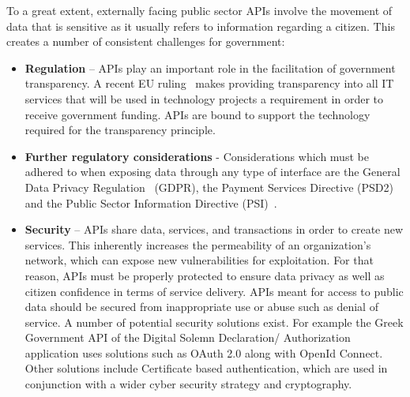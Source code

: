 To a great extent, externally facing public sector APIs involve the movement
of data that is sensitive as it usually refers to information regarding
a citizen. This creates a number of consistent challenges for government:
\begin{itemize}
	\item \textbf{Regulation} – APIs play an important role in the facilitation of
	government transparency. A recent EU ruling~\citep{eu_funding} makes providing
	transparency into all IT services that will be used in technology projects
	a requirement in order to receive government funding. APIs are bound to support the
	technology required for the transparency principle.
	
	\item \textbf{Further regulatory considerations} - Considerations which
	must be adhered to when	exposing data through any type of interface are
	the General Data Privacy Regulation~\cite{eu_gdpr} (GDPR), the Payment
	Services Directive	(PSD2)~\citep{eu_payment_directives} and the Public Sector Information
	Directive (PSI)~\citep{public_sector_info}.
	
	\item \textbf{Security} – APIs share data, services, and transactions in order to create new services. This inherently increases the permeability of an
	organization’s network, which can expose new vulnerabilities for
	exploitation. For that reason, APIs must be properly protected to ensure data
	privacy as well as citizen confidence in terms of service delivery.
	APIs meant for access to public data should be secured from inappropriate
	use or abuse such as denial of service. A number of potential security solutions exist.
	For example the Greek Government API of the Digital Solemn Declaration/ Authorization
	application uses solutions such as OAuth 2.0 along with OpenId Connect. Other solutions
	include Certificate based authentication, which are used in conjunction with a wider cyber security strategy and cryptography.
	

\end{itemize}
